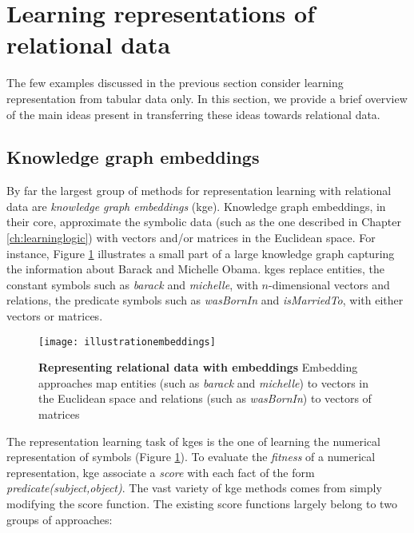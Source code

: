 \section{Learning representations of relational data}


The few examples discussed in the previous section consider learning representation from tabular data only.
In this section, we provide a brief overview of the main ideas present in transferring these ideas towards relational data.


\subsection{Knowledge graph embeddings}


By far the largest group of methods for representation learning with relational data are \textit{knowledge graph embeddings} (\gls{kge}).
Knowledge graph embeddings, in their core, approximate the symbolic data (such as the one described in Chapter \ref{ch:learninglogic}) with vectors and/or matrices in the Euclidean space.
For instance, Figure \ref{fig:emb} illustrates a small part of a large knowledge graph capturing the information about Barack and Michelle Obama.
\gls{kge}s replace entities, the constant symbols such as \textit{barack} and \textit{michelle}, with $n$-dimensional vectors and relations, the predicate symbols such as \textit{wasBornIn} and \textit{isMarriedTo}, with either vectors or matrices.

 \begin{figure}
	\centering
	\texttt{[image: illustrationembeddings]}
	\caption[Representing relational data with embeddings]{\textbf{Representing relational data with embeddings} Embedding approaches map entities (such as \textit{barack} and \textit{michelle}) to vectors in the Euclidean space and relations (such as \textit{wasBornIn}) to vectors of matrices}
	\label{fig:emb}
\end{figure}




The representation learning task of \gls{kge}s is the one of learning the numerical representation of symbols (Figure \ref{fig:emb}).
To evaluate the \textit{fitness} of a numerical representation, \gls{kge} associate a \textit{score} with each fact of the form \textit{predicate(subject,object)}.
The vast variety of \gls{kge} methods comes from simply modifying the score function.
The existing score functions largely belong to two groups of approaches:

